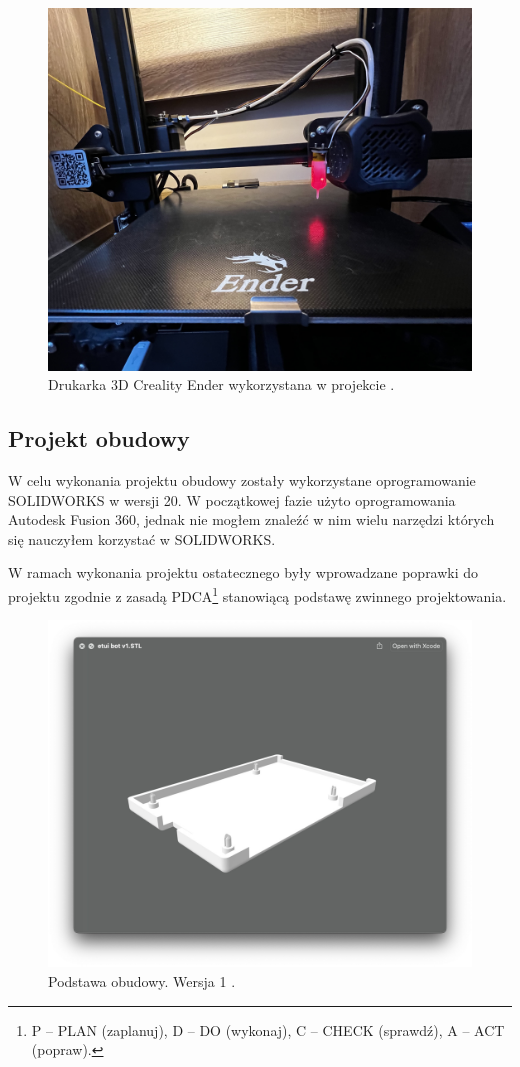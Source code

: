 \documentclass[a4paper,12pt,reqno]{article}
\begin{document}
\begin{figure}[H]%
\centering
\includegraphics[width=0.8\columnwidth]{imgs/ender3v2.jpg}
\caption{Drukarka 3D Creality Ender wykorzystana w projekcie \cite{img_me}. \label{ender3d}}
\quad
\end{figure}

\newpage
\subsection{Projekt obudowy}
W celu wykonania projektu obudowy zostały wykorzystane oprogramowanie SOLIDWORKS w wersji 20.
W początkowej fazie użyto oprogramowania Autodesk Fusion 360, jednak nie mogłem znaleźć w nim wielu narzędzi których się nauczyłem korzystać w SOLIDWORKS.

W ramach wykonania projektu ostatecznego były wprowadzane poprawki do projektu zgodnie z zasadą PDCA\footnote{P – PLAN (zaplanuj), D – DO (wykonaj), C – CHECK (sprawdź), A – ACT (popraw).} stanowiącą podstawę zwinnego projektowania.

\begin{figure}[H]%
\centering
\includegraphics[width=0.8\columnwidth]{imgs/etui_bot_v1.jpg}
\caption{Podstawa obudowy. Wersja 1 \cite{img_me}. \label{etui_bot_v1}}
\quad
\end{figure}
\end{document}
